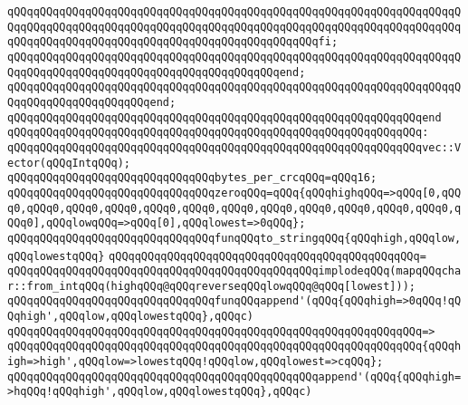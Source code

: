 \verb|qQQqqQQqqQQqqQQqqQQqqQQqqQQqqQQqqQQqqQQqqQQqqQQqqQQqqQQqqQQqqQQqqQQqqQQqqQQqqQQqqQQqqQQqqQQqqQQqqQQqqQQqqQQqqQQqqQQqqQQqqQQqqQQqqQQqqQQqqQQqqQQqqQQqqQQqqQQqqQQqqQQqqQQqqQQqqQQqqQQqqQQqqQQqfi;|\newline
\verb|qQQqqQQqqQQqqQQqqQQqqQQqqQQqqQQqqQQqqQQqqQQqqQQqqQQqqQQqqQQqqQQqqQQqqQQqqQQqqQQqqQQqqQQqqQQqqQQqqQQqqQQqqQQqqQQqend;|\newline
\verb|qQQqqQQqqQQqqQQqqQQqqQQqqQQqqQQqqQQqqQQqqQQqqQQqqQQqqQQqqQQqqQQqqQQqqQQqqQQqqQQqqQQqqQQqqQQqend;|\newline
\verb|qQQqqQQqqQQqqQQqqQQqqQQqqQQqqQQqqQQqqQQqqQQqqQQqqQQqqQQqqQQqqQQqend|\newline
\verb|qQQqqQQqqQQqqQQqqQQqqQQqqQQqqQQqqQQqqQQqqQQqqQQqqQQqqQQqqQQqqQQq:|\newline
\verb|qQQqqQQqqQQqqQQqqQQqqQQqqQQqqQQqqQQqqQQqqQQqqQQqqQQqqQQqqQQqqQQqvec::Vector(qQQqIntqQQq);|\newline
\newline
\verb|qQQqqQQqqQQqqQQqqQQqqQQqqQQqqQQqbytes_per_crcqQQq=qQQq16;|\newline
\newline
\verb|qQQqqQQqqQQqqQQqqQQqqQQqqQQqqQQqzeroqQQq=qQQq{qQQqhighqQQq=>qQQq[0,qQQq0,qQQq0,qQQq0,qQQq0,qQQq0,qQQq0,qQQq0,qQQq0,qQQq0,qQQq0,qQQq0,qQQq0,qQQq0],qQQqlowqQQq=>qQQq[0],qQQqlowest=>0qQQq};|\newline
\newline
\verb|qQQqqQQqqQQqqQQqqQQqqQQqqQQqqQQqfunqQQqto_stringqQQq{qQQqhigh,qQQqlow,qQQqlowestqQQq}|\newline
\verb|qQQqqQQqqQQqqQQqqQQqqQQqqQQqqQQqqQQqqQQqqQQqqQQq=|\newline
\verb|qQQqqQQqqQQqqQQqqQQqqQQqqQQqqQQqqQQqqQQqqQQqqQQqimplodeqQQq(mapqQQqchar::from_intqQQq(highqQQq@qQQqreverseqQQqlowqQQq@qQQq[lowest]));|\newline
\newline
\verb|qQQqqQQqqQQqqQQqqQQqqQQqqQQqqQQqfunqQQqappend'(qQQq{qQQqhigh=>0qQQq!qQQqhigh',qQQqlow,qQQqlowestqQQq},qQQqc)|\newline
\verb|qQQqqQQqqQQqqQQqqQQqqQQqqQQqqQQqqQQqqQQqqQQqqQQqqQQqqQQqqQQqqQQq=>|\newline
\verb|qQQqqQQqqQQqqQQqqQQqqQQqqQQqqQQqqQQqqQQqqQQqqQQqqQQqqQQqqQQqqQQq{qQQqhigh=>high',qQQqlow=>lowestqQQq!qQQqlow,qQQqlowest=>cqQQq};|\newline
\newline
\verb|qQQqqQQqqQQqqQQqqQQqqQQqqQQqqQQqqQQqqQQqqQQqqQQqappend'(qQQq{qQQqhigh=>hqQQq!qQQqhigh',qQQqlow,qQQqlowestqQQq},qQQqc)|\newline
